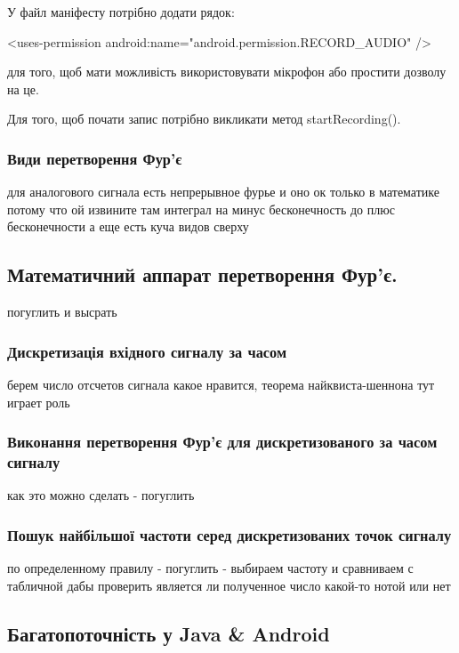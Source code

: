 У файл маніфесту потрібно додати рядок:

<uses-permission android:name="android.permission.RECORD\_AUDIO" />

для того, щоб мати можливість використовувати мікрофон або простити дозволу на це.

Для того, щоб почати запис потрібно викликати метод startRecording().



\subsubsection{Види перетворення Фур'є}

для аналогового сигнала есть непрерывное фурье и оно ок только в математике потому что ой извините там интеграл на минус бесконечность до плюс бесконечности
а еще есть куча видов сверху

\subsection{Математичний аппарат перетворення Фур'є.}

погуглить и высрать

\subsubsection{Дискретизація вхідного сигналу за часом}

берем число отсчетов сигнала какое нравится, теорема найквиста-шеннона тут играет роль

\subsubsection{Виконання перетворення Фур'є для дискретизованого за часом сигналу}

как это можно сделать - погуглить

\subsubsection{Пошук найбільшої частоти серед дискретизованих точок сигналу}

по определенному правилу - погуглить - выбираем частоту и сравниваем с табличной дабы проверить является ли полученное число какой-то нотой или нет

\subsection{Багатопоточність у Java \& Android}


